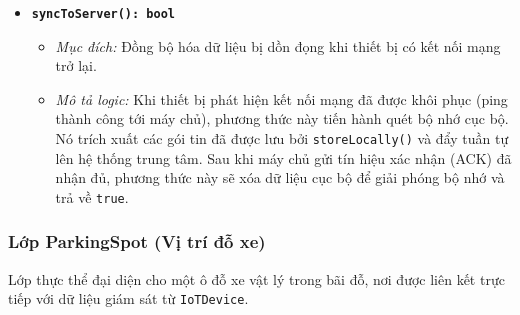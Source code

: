 \begin{itemize}
\begin{itemize}
        \item \textbf{\texttt{syncToServer(): bool}}
        \begin{itemize}
            \item \textit{Mục đích:} Đồng bộ hóa dữ liệu bị dồn đọng khi thiết bị có kết nối mạng trở lại.
            \item \textit{Mô tả logic:} Khi thiết bị phát hiện kết nối mạng đã được khôi phục (ping thành công tới máy chủ), phương thức này tiến hành quét bộ nhớ cục bộ. Nó trích xuất các gói tin đã được lưu bởi \texttt{storeLocally()} và đẩy tuần tự lên hệ thống trung tâm. Sau khi máy chủ gửi tín hiệu xác nhận (ACK) đã nhận đủ, phương thức này sẽ xóa dữ liệu cục bộ để giải phóng bộ nhớ và trả về \texttt{true}.
        \end{itemize}
    \end{itemize}
\end{itemize}

\subsubsection{Lớp ParkingSpot (Vị trí đỗ xe)}
Lớp thực thể đại diện cho một ô đỗ xe vật lý trong bãi đỗ, nơi được liên kết trực tiếp với dữ liệu giám sát từ \texttt{IoTDevice}.

